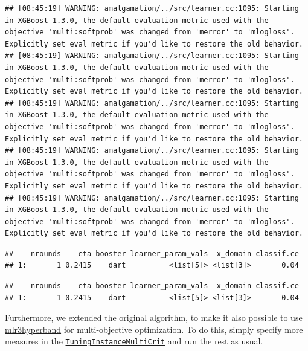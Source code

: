 \documentclass[
]{scrbook}
\newenvironment{Shaded}{\begin{snugshade}}{\end{snugshade}}
\newcommand{\NormalTok}[1]{#1}
\newcommand{\SpecialCharTok}[1]{\textcolor[rgb]{0.00,0.00,0.00}{#1}}
\renewenvironment{Shaded} {\begin{snugshade}\small} {\end{snugshade}}
\begin{document}
\begin{verbatim}
## [08:45:19] WARNING: amalgamation/../src/learner.cc:1095: Starting in XGBoost 1.3.0, the default evaluation metric used with the objective 'multi:softprob' was changed from 'merror' to 'mlogloss'. Explicitly set eval_metric if you'd like to restore the old behavior.
## [08:45:19] WARNING: amalgamation/../src/learner.cc:1095: Starting in XGBoost 1.3.0, the default evaluation metric used with the objective 'multi:softprob' was changed from 'merror' to 'mlogloss'. Explicitly set eval_metric if you'd like to restore the old behavior.
## [08:45:19] WARNING: amalgamation/../src/learner.cc:1095: Starting in XGBoost 1.3.0, the default evaluation metric used with the objective 'multi:softprob' was changed from 'merror' to 'mlogloss'. Explicitly set eval_metric if you'd like to restore the old behavior.
## [08:45:19] WARNING: amalgamation/../src/learner.cc:1095: Starting in XGBoost 1.3.0, the default evaluation metric used with the objective 'multi:softprob' was changed from 'merror' to 'mlogloss'. Explicitly set eval_metric if you'd like to restore the old behavior.
## [08:45:19] WARNING: amalgamation/../src/learner.cc:1095: Starting in XGBoost 1.3.0, the default evaluation metric used with the objective 'multi:softprob' was changed from 'merror' to 'mlogloss'. Explicitly set eval_metric if you'd like to restore the old behavior.
\end{verbatim}

\begin{verbatim}
##    nrounds    eta booster learner_param_vals  x_domain classif.ce
## 1:       1 0.2415    dart          <list[5]> <list[3]>       0.04
\end{verbatim}

\begin{Shaded}
\end{Shaded}

\begin{verbatim}
##    nrounds    eta booster learner_param_vals  x_domain classif.ce
## 1:       1 0.2415    dart          <list[5]> <list[3]>       0.04
\end{verbatim}

Furthermore, we extended the original algorithm, to make it also possible to use \href{https://mlr3hyperband.mlr-org.com}{mlr3hyperband} for multi-objective optimization.
To do this, simply specify more measures in the \href{https://mlr3tuning.mlr-org.com/reference/TuningInstanceMultiCrit.html}{\texttt{TuningInstanceMultiCrit}} and run the rest as usual.
\end{document}
